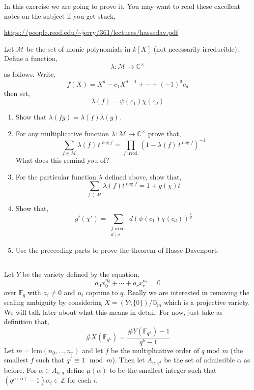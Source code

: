 \documentclass[12pt]{article}
\newcommand{\sm}{\! \setminus \!}
\newcommand{\ZZ}{\mathbb{Z}}
\newcommand{\FF}{\mathbb{F}}
\newcommand{\CC}{\mathbb{C}}
\newcommand{\divides}{\mid}
\theoremstyle{remark}
\theoremstyle{definition}
\newcommand{\lcm}{\mathrm{lcm}}
\newcommand{\Gm}{\mathbb{G}_m}
\begin{document}
In this exercise we are going to prove it. You may want to read these excellent notes on the subject if you get stuck,

\newcommand{\M}{\mathcal{M}}

\begin{center}
\url{https://people.reed.edu/~jerry/361/lectures/hassedav.pdf}
\end{center}

Let $\M$ be the set of monic polynomials in $k[X]$ (not necessarily irreducible). Define a function,
\[ \lambda : \M \to \CC^\times \]
as follows. Write,
\[ f(X) = X^d - c_1 X^{d-1} + \cdots + (-1)^d c_d \]
then set,
\[ \lambda(f) = \psi(c_1) \chi(c_d) \]

\begin{enumerate}
\item Show that $\lambda(fg) = \lambda(f) \lambda(g)$.

\item For any multiplicative function $\lambda : \M \to \CC^\times$ prove that,
\[ \sum_{f \in \M} \lambda(f) \, t^{\deg{f}} = \prod_{f \text{ irred.}} (1 - \lambda(f) \, t^{\deg{f}})^{-1} \]
What does this remind you of?

\item For the particular function $\lambda$ defined above, show that,
\[ \sum_{f \in \M} \lambda(f) t^{\deg{f}} = 1 + g(\chi) t \]

\item Show that,
\[ g'(\chi') = \sum_{\substack{f \text{ irred.} \\ d \divides \nu}} d (\psi(c_1) \chi(c_d))^{\frac{s}{d}} \]

\item Use the preceeding parts to prove the theorem of Hasse-Davenport.
\end{enumerate}

\subsection{} \label{proof_of_thm}

Let $Y$ be the variety defined by the equation,
\[ a_0 x_0^{n_0} + \cdots + a_r x_r^{n_r} = 0 \]
over $\FF_q$ with $a_i \neq 0$ and $n_i$ coprime to $q$. Really we are interested in removing the scaling ambiguity by considering $X = (Y \sm \{ 0 \})/\Gm$ which is a projective variety. We will talk later about what this means in detail. For now, just take as definition that,
\[ \# X(\FF_{q^k}) = \frac{\# Y(\FF_{q^k}) - 1}{q^k - 1} \]
Let $m = \lcm{(n_0, \dots, n_r)}$ and let $f$ be the multiplicative order of $q$ mod $m$ (the smallest $f$ such that $q^f \equiv 1 \mod m$). Then let $A_{n,q^f}$ be the set of admissible $\alpha$ as before. For $\alpha \in A_{n,q}$ define $\mu(\alpha)$ to be the smallest integer such that $(q^{\mu(\alpha)}-1) \alpha_i \in \ZZ$ for each $i$.
\end{document}
